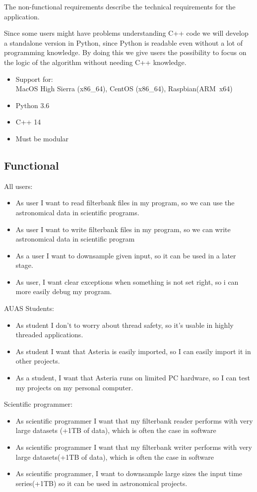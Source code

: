 \documentclass[a4paper,11pt]{report}
\begin{document}
    The non-functional requirements describe the technical requirements for the application.
    
    Since some users might have problems understanding C++ code we will develop a standalone version in Python, since Python is readable even without a lot of programming knowledge.
	By doing this we give users the possibility to focus on the logic of the algorithm without needing C++ knowledge.
    
    \begin{itemize}
        \item Support for:\\ MacOS High Sierra (x86\_64), CentOS (x86\_64), Raspbian(ARM\ x64)
        \item Python 3.6
        \item C++ 14
        \item Must be modular
    \end{itemize}
    
    \subsection{Functional}

    All users:
	\begin{itemize}
        \item As user I want to read filterbank files in my program, so we can use the astronomical data in scientific programs.
        \item As user I want to write filterbank files in my program, so we can write astronomical data in scientific program
		\item As a user I want to downsample given input, so it can be used in a later stage.
		\item As user, I want clear exceptions when something is not set right, so i can more easily debug my program.
	\end{itemize}
	AUAS Students:
	\begin{itemize}
		\item As student I don't to worry about thread safety, so it's usable in highly threaded applications.
		\item As student I want that Asteria is easily imported, so I can easily import it in other projects.
		\item As a student, I want that Asteria runs on limited PC hardware, so I can test my projects on my personal computer.
    \end{itemize}
	Scientific programmer:
	\begin{itemize}
        \item As scientific programmer I want that my filterbank reader performs with very large datasets (+1TB of data), which is often the case in software
        \item As scientific programmer I want that my filterbank writer performs with very large datasets(+1TB of data), which is often the case in software
		\item As scientific programmer, I want to downsample large sizes the input time series(+1TB) so it can be used in astronomical projects.
    \end{itemize}    
\end{document}
